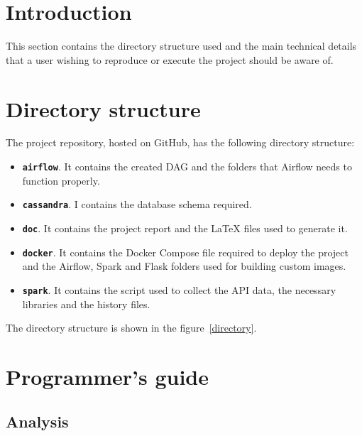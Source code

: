 
\section{Introduction}

\nonzeroparskip This section contains the directory structure used and the main technical details that a user wishing to reproduce or execute the project should be aware of.

\section{Directory structure}
\nonzeroparskip The project repository, hosted on GitHub, has the following directory structure:
\begin{itemize}
	\item \textbf{\texttt{airflow}}. It contains the created DAG and the folders that Airflow needs to function properly.
	\item \textbf{\texttt{cassandra}}. I contains the database schema required.
	\item \textbf{\texttt{doc}}. It contains the project report and the \LaTeX{} files used to generate it.
	\item \textbf{\texttt{docker}}. It contains the Docker Compose file required to deploy the project and the Airflow, Spark and Flask folders used for building custom images.
	\item \textbf{\texttt{spark}}. It contains the script used to collect the API data, the necessary libraries and the history files.
\end{itemize}

\nonzeroparskip The directory structure is shown in the figure~\ref{directory}.


\section{Programmer's guide}

\subsection{Analysis}

